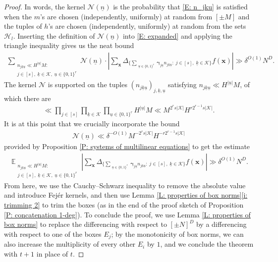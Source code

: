 \documentclass[11pt]{amsart}
\theoremstyle{definition}
\DeclareMathOperator*{\E}{\mathbb{E}}
\newcommand{\CH}{{\mathcal H}}
\newcommand{\CK}{{\mathcal K}}
\newcommand{\CN}{{\mathcal N}}
\newcommand{\bx}{{\mathbf{x}}}
\newcommand{\bgamma}{{\boldsymbol{\gamma}}}
\newcommand{\uk}{{\underline{k}}}
\newcommand{\un}{{\underline{n}}}
\newcommand{\uu}{{\underline{u}}}
\newcommand{\abs}[1]{\mathopen{}\left| #1\mathclose{}\right|}
\begin{document}
\begin{proof}
    In words, the kernel $\CN(\un)$ is the probability that \eqref{E: n_jku} is satisfied when the $m$'s are chosen (independently, uniformly) at random from $[\pm M]$ and the tuples of $h$'s are chosen (independently, uniformly) at random from the sets $\CH_l$.
    Inserting the definition of $\CN(\un)$ into \eqref{E: expanded} and applying the triangle inequality gives us the neat bound
    \begin{align*}
        \sum_{\substack{n_{j\uk\uu}\ll H^{|\uu|}M:\\ j\in[s],\; \uk\in\CK,\; \uu\in\{0,1\}^r 
        }}\CN(\un)\cdot\abs{\sum_\bx \Delta_{\{\sum_{\substack{\uu\in\{0,1\}^r
        }}\bgamma_{j\uu} n_{j\uk\uu}:\; j\in[s],\; \uk\in\CK\}}f(\bx)}\gg \delta^{O(1)} N^D.
    \end{align*}
    The kernel $\CN$ is supported on the tuples 
    $(n_{j\uk\uu})_{j,\uk,\uu}$ satisfying $n_{j\uk\uu}\ll H^{|\uu|} M$, of which there are
    \begin{align*}
        \ll \prod_{j\in[s]}\prod_{\uk\in\CK} \prod_{\uu\in\{0,1\}^r} H^{|\uu|} M \ll  M^{2^r s |\CK|} H^{r 2^{r-1} s |\CK|}. 
    \end{align*}
    It is at this point that we crucially incorporate the bound
    \begin{align}\label{E: naive estimate}
        \CN(\un)\ll \delta^{-O(1)}  M^{- 2^r s |\CK|} H^{-r 2^{r-1} s |\CK|}
    \end{align}
    provided by  Proposition \ref{P: systems of multilinear equations} to get the estimate
    \begin{align*}
        \E_{\substack{n_{j\uk\uu}\ll H^{|\uu|}M:\\ j\in[s],\; \uk\in\CK,\; \uu\in\{0,1\}^r
        }}\abs{\sum_\bx \Delta_{\{\sum_{\substack{\uu\in\{0,1\}^r
        }}\bgamma_{j\uu} n_{j\uk\uu}:\; j\in[s],\; \uk\in\CK\}}f(\bx)}\gg \delta^{O(1)} N^D.
    \end{align*}
From here, we use the Cauchy--Schwarz inequality to remove the absolute value and introduce Fej\'er kernels, and then use Lemma \ref{L: properties of box norms}\eqref{i: trimming 2} to trim the boxes (as in the end of the proof sketch of Proposition \ref{P: concatenation 1-deg}).  To conclude the proof, we use Lemma \ref{L: properties of box norms} to replace the differencing with respect to $[\pm N]^D$ by a differencing with respect to one of the boxes $E_j$; by the monotonicity of box norms, we can also increase the multiplicity of every other $E_i$ by $1$, and we conclude the theorem with $t+1$ in place of $t$.
\end{proof}
\end{document}
